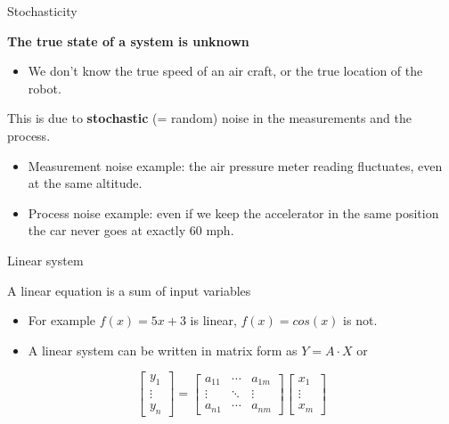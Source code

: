 \documentclass[compress]{beamer}
\begin{document}
\begin{frame}{Stochasticity}

    \textbf{The true state of a system is unknown}

    \begin{itemize}
        \item We don't know the true speed of an air craft, or the true location
            of the robot.
    \end{itemize}

    This is due to \textbf{stochastic} (= random) noise in the measurements and the
    process.

    \begin{itemize}
        \item Measurement noise example: the air pressure meter reading fluctuates,
            even at the same altitude.
        \item Process noise example: even if we keep the accelerator in the same
            position the car never goes at exactly 60 mph.
    \end{itemize}

\end{frame}

\begin{frame}{Linear system}

A linear equation is a sum of input variables

\begin{itemize}
    \item   For example $f(x)=5x+3$ is linear, $f(x)=cos(x)$ is not.
    \item A linear system can be written in matrix form as $Y=A\cdot X$ or
\end{itemize}

\[
\begin{bmatrix}
    y_1 \\
    \vdots \\ 
    y_n
\end{bmatrix}
=
\begin{bmatrix}
    a_{11} & \cdots & a_{1m}\\ 
    \vdots & \ddots &  \vdots \\ 
    a_{n1} & \cdots & a_{nm}
\end{bmatrix}
\begin{bmatrix}
    x_1 \\
    \vdots \\ 
    x_m
\end{bmatrix}
\]

\end{frame}
\end{document}
